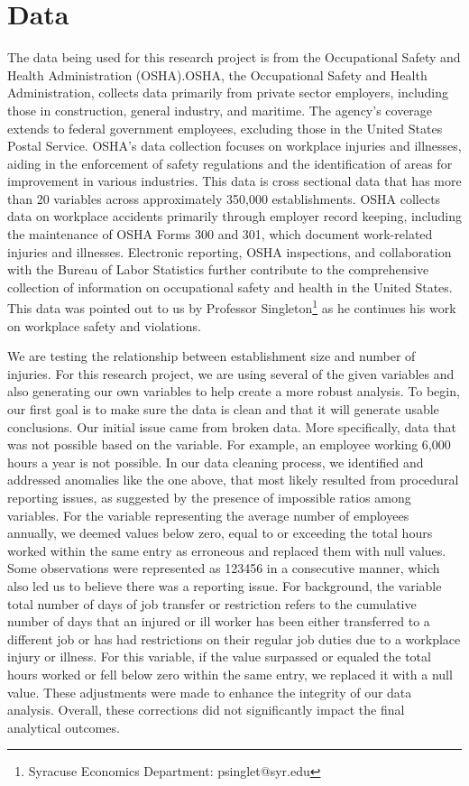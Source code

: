 \documentclass[12pt]{article}
\begin{document}
\section{Data}
\label{sec:data}

The data being used for this research project is from the Occupational Safety and Health Administration (OSHA).OSHA, the Occupational Safety and Health Administration, collects data primarily from private sector employers, including those in construction, general industry, and maritime. The agency's coverage extends to federal government employees, excluding those in the United States Postal Service. OSHA's data collection focuses on workplace injuries and illnesses, aiding in the enforcement of safety regulations and the identification of areas for improvement in various industries. This data is cross sectional data that has more than 20 variables across approximately 350,000 establishments. OSHA collects data on workplace accidents primarily through employer record keeping, including the maintenance of OSHA Forms 300 and 301, which document work-related injuries and illnesses. Electronic reporting, OSHA inspections, and collaboration with the Bureau of Labor Statistics further contribute to the comprehensive collection of information on occupational safety and health in the United States. This data was pointed out to us by Professor Singleton\thanks{Syracuse Economics Department: psinglet@syr.edu} as he continues his work on workplace safety and violations.
   
We are testing the relationship between establishment size and number of injuries. For this research project, we are using several of the given variables and also generating our own variables to help create a more robust analysis. To begin, our first goal is to make sure the data is clean and that it will generate usable conclusions. Our initial issue came from broken data. More specifically, data that was not possible based on the variable. For example, an employee working 6,000 hours a year is not possible. In our data cleaning process, we identified and addressed anomalies like the one above, that most likely resulted from procedural reporting issues, as suggested by the presence of impossible ratios among variables. For the variable representing the average number of employees annually, we deemed values below zero, equal to or exceeding the total hours worked within the same entry as erroneous and replaced them with null values. Some observations were represented as 123456 in a consecutive manner, which also led us to believe there was a reporting issue. For background, the variable total number of days of job transfer or restriction refers to the cumulative number of days that an injured or ill worker has been either transferred to a different job or has had restrictions on their regular job duties due to a workplace injury or illness. For this variable, if the value surpassed or equaled the total hours worked or fell below zero within the same entry, we replaced it with a null value.  These adjustments were made to enhance the integrity of our data analysis. Overall, these corrections did not significantly impact the final analytical outcomes.
    
\end{document}
